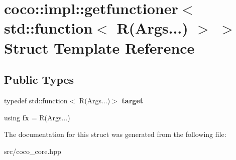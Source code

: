 \hypertarget{structcoco_1_1impl_1_1getfunctioner_3_01std_1_1function_3_01_r_07_args_8_8_8_08_01_4_01_4}{}\section{coco\+:\+:impl\+:\+:getfunctioner$<$ std\+:\+:function$<$ R(Args...) $>$ $>$ Struct Template Reference}
\label{structcoco_1_1impl_1_1getfunctioner_3_01std_1_1function_3_01_r_07_args_8_8_8_08_01_4_01_4}
\subsection*{Public Types}
\begin{DoxyCompactItemize}
\item 
\hypertarget{structcoco_1_1impl_1_1getfunctioner_3_01std_1_1function_3_01_r_07_args_8_8_8_08_01_4_01_4_a8a0ab3a18eea8ead50fed7ac6e9670b2}{}typedef std\+::function$<$ R(Args...)$>$ {\bfseries target}\label{structcoco_1_1impl_1_1getfunctioner_3_01std_1_1function_3_01_r_07_args_8_8_8_08_01_4_01_4_a8a0ab3a18eea8ead50fed7ac6e9670b2}

\item 
\hypertarget{structcoco_1_1impl_1_1getfunctioner_3_01std_1_1function_3_01_r_07_args_8_8_8_08_01_4_01_4_a4473bf83da1d20b603ae38bf5b6e1977}{}using {\bfseries fx} = R(Args...)\label{structcoco_1_1impl_1_1getfunctioner_3_01std_1_1function_3_01_r_07_args_8_8_8_08_01_4_01_4_a4473bf83da1d20b603ae38bf5b6e1977}

\end{DoxyCompactItemize}


The documentation for this struct was generated from the following file\+:\begin{DoxyCompactItemize}
\item 
src/coco\+\_\+core.\+hpp\end{DoxyCompactItemize}
